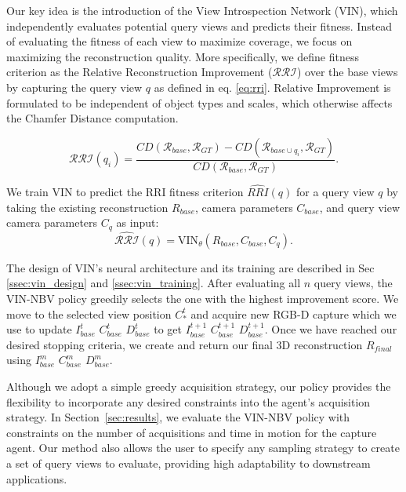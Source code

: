 Our key idea is the introduction of the View Introspection Network (VIN), which independently evaluates potential query views and predicts their fitness. Instead of evaluating the fitness of each view to maximize coverage, we focus on maximizing the reconstruction quality. More specifically, we define fitness criterion as the Relative Reconstruction Improvement ($\mathcal{RRI}$) over the base views by capturing the query view $q$ as defined in eq. \ref{eq:rri}. Relative Improvement is formulated to be independent of object types and scales, which otherwise affects the Chamfer Distance computation.

\vspace{-1em}
\begin{equation}
    \mathcal{RRI}(q_i) = \frac{CD(\mathcal{R}_{base},\mathcal{R}_{GT}) -CD(\mathcal{R}_{base \cup q_i},\mathcal{R}_{GT})}{CD(\mathcal{R}_{base},\mathcal{R}_{GT})}.
    \label{eq:rri}
\end{equation}

We train VIN to predict the RRI fitness criterion $\widehat{RRI}(q)$ for a query view $q$ by taking the existing reconstruction $R_{base}$, camera parameters $C_{base}$, and query view camera parameters $C_q$ as input:
\begin{equation}
    \widehat{\mathcal{RRI}}(q) = \text{VIN}_\theta(R_{base}, C_{base}, C_q).
\label{eq:vin}
\end{equation}
\vspace{-1.7em}

The design of VIN's neural architecture and its training are described in Sec \ref{ssec:vin_design} and \ref{ssec:vin_training}. After evaluating all $n$ query views, the VIN-NBV policy greedily selects the one with the highest improvement score. We move to the selected view position $C^t_*$ and acquire new RGB-D capture which we use to update $I^t_{base}$ $C^t_{base}$ $D^t_{base}$ to get $I^{t+1}_{base}$ $C^{t+1}_{base}$ $D^{t+1}_{base}$. Once we have reached our desired stopping criteria, we create and return our final 3D reconstruction $R_{final}$ using $I^{m}_{base}$ $C^{m}_{base}$ $D^{m}_{base}$.

Although we adopt a simple greedy acquisition strategy, our policy provides the flexibility to incorporate any desired constraints into the agent's acquisition strategy. In Section~\ref{sec:results}, we evaluate the VIN-NBV policy with constraints on the number of acquisitions and time in motion for the capture agent. Our method also allows the user to specify any sampling strategy to create a set of query views to evaluate, providing high adaptability to downstream applications.


